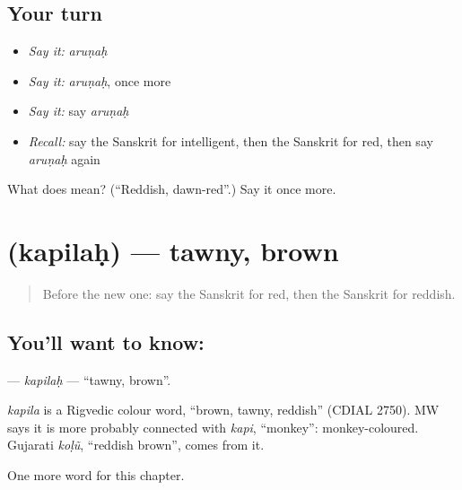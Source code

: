 \subsection*{Your turn}
\begin{itemize}
\raggedright
  \item \emph{Say it:} \emph{aruṇaḥ}
  \item \emph{Say it:} \emph{aruṇaḥ}, once more
  \item \emph{Say it:} say \emph{aruṇaḥ}
  \item \emph{Recall:} say the Sanskrit for intelligent, then the Sanskrit for red, then say \emph{aruṇaḥ} again
\end{itemize}

\begin{tcolorbox}[breakable,colback=teal!4,colframe=teal!35!black,title={Before you move on}]
What does  mean? (\textquotedblleft{}Reddish, dawn-red\textquotedblright{}.) Say it once more.
\end{tcolorbox}
\section[\texorpdfstring{\sk{कपिलः} (kapilaḥ)}{कपिलः (kapilaḥ)}]{ (kapilaḥ) — tawny, brown}

\label{lesson:SA-C217-kapilah}



\begin{quote}
Before the new one: say the Sanskrit for red, then the Sanskrit for reddish.
\end{quote}

\subsection*{You'll want to know: }
\textbf{} — \emph{kapilaḥ} — \textquotedblleft{}tawny, brown\textquotedblright{}.

\begin{cousinweb}
\emph{kapila} is a Rigvedic colour word, \textquotedblleft{}brown, tawny, reddish\textquotedblright{} (CDIAL 2750). MW says it is more probably connected with \emph{kapi}, \textquotedblleft{}monkey\textquotedblright{}: monkey-coloured. Gujarati \emph{koḷũ}, \textquotedblleft{}reddish brown\textquotedblright{}, comes from it.
\end{cousinweb}

\begin{grammarlens}[title={What you've built}]
One more word for this chapter.
\end{grammarlens}

